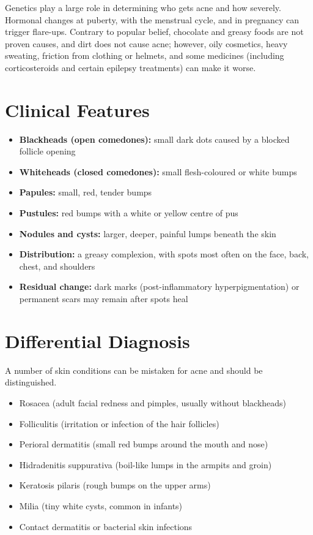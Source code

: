Genetics play a large role in determining who gets acne and how severely. Hormonal changes at puberty, with the menstrual cycle, and in pregnancy can trigger flare-ups. Contrary to popular belief, chocolate and greasy foods are not proven causes, and dirt does not cause acne; however, oily cosmetics, heavy sweating, friction from clothing or helmets, and some medicines (including corticosteroids and certain epilepsy treatments) can make it worse.

\section*{Clinical Features}
\begin{itemize}
    \item \textbf{Blackheads (open comedones):} small dark dots caused by a blocked follicle opening
    \item \textbf{Whiteheads (closed comedones):} small flesh-coloured or white bumps
    \item \textbf{Papules:} small, red, tender bumps
    \item \textbf{Pustules:} red bumps with a white or yellow centre of pus
    \item \textbf{Nodules and cysts:} larger, deeper, painful lumps beneath the skin
    \item \textbf{Distribution:} a greasy complexion, with spots most often on the face, back, chest, and shoulders
    \item \textbf{Residual change:} dark marks (post-inflammatory hyperpigmentation) or permanent scars may remain after spots heal
\end{itemize}

\section*{Differential Diagnosis}
A number of skin conditions can be mistaken for acne and should be distinguished.

\begin{itemize}
    \item Rosacea (adult facial redness and pimples, usually without blackheads)
    \item Folliculitis (irritation or infection of the hair follicles)
    \item Perioral dermatitis (small red bumps around the mouth and nose)
    \item Hidradenitis suppurativa (boil-like lumps in the armpits and groin)
    \item Keratosis pilaris (rough bumps on the upper arms)
    \item Milia (tiny white cysts, common in infants)
    \item Contact dermatitis or bacterial skin infections
\end{itemize}

